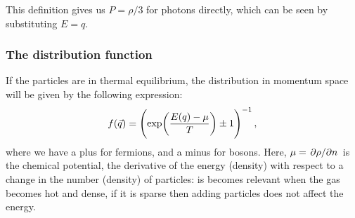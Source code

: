 \documentclass[main.tex]{subfiles}
\begin{document}

This definition gives us \(P = \rho /3\) for photons directly, which can be seen by substituting \(E = q\). 

\subsubsection{The distribution function}

If the particles are in thermal equilibrium, the distribution in momentum space will be given by the following expression: 
%
\begin{equation}
  f(\vec{q}) = \qty(\exp(\frac{E(q)- \mu }{T}) \pm 1 )^{-1}
\,,
\end{equation}
%
where we have a plus for fermions, and a minus for bosons. Here, \(\mu = \pdv*{\rho }{n}\) is the chemical potential, the derivative of the energy (density) with respect to a change in the number (density) of particles: is becomes relevant when the gas becomes hot and dense, if it is sparse then adding particles does not affect the energy.

\end{document}

